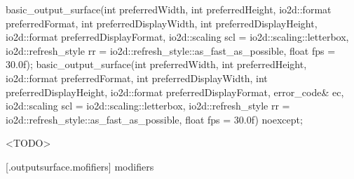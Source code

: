 %
\begin{itemdecl}
basic_output_surface(int preferredWidth, int preferredHeight,
  io2d::format preferredFormat, int preferredDisplayWidth,
  int preferredDisplayHeight, io2d::format preferredDisplayFormat,
  io2d::scaling scl = io2d::scaling::letterbox,
  io2d::refresh_style rr = io2d::refresh_style::as_fast_as_possible,
  float fps = 30.0f);
basic_output_surface(int preferredWidth, int preferredHeight,
  io2d::format preferredFormat, int preferredDisplayWidth,
  int preferredDisplayHeight, io2d::format preferredDisplayFormat,
  error_code& ec, io2d::scaling scl = io2d::scaling::letterbox,
  io2d::refresh_style rr = io2d::refresh_style::as_fast_as_possible,
  float fps = 30.0f) noexcept;
\end{itemdecl}
\begin{itemdescr}
\pnum
<TODO>
\end{itemdescr}
 [\iotwod.outputsurface.mofifiers] { modifiers}

